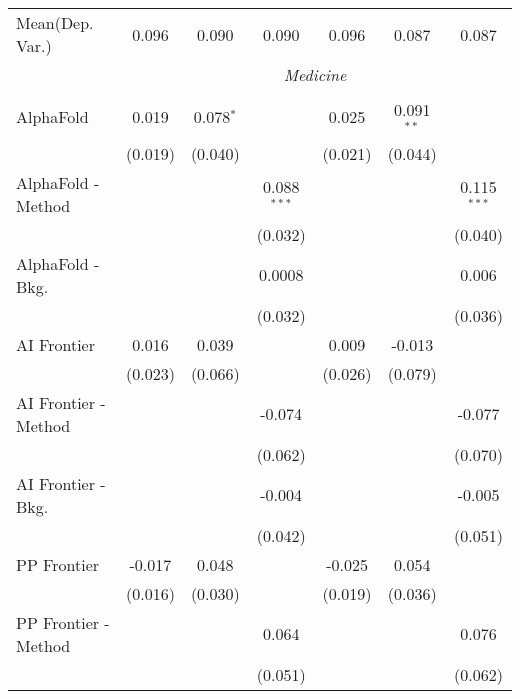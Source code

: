 \begin{tabular}{lcccccc}
Mean(Dep. Var.) & 0.096 & 0.090 & 0.090 & 0.096 & 0.087 & 0.087 \\
 & \multicolumn{6}{c}{\textit{Medicine}} \\ \\
   AlphaFold            & 0.019         & 0.078$^{*}$ &                & 0.025        & 0.091$^{**}$ &   \\   
                        & (0.019)       & (0.040)     &                & (0.021)      & (0.044)      &   \\   
   AlphaFold - Method   &               &             & 0.088$^{***}$  &              &              & 0.115$^{***}$\\   
                        &               &             & (0.032)        &              &              & (0.040)\\   
   AlphaFold - Bkg.     &               &             & 0.0008         &              &              & 0.006\\   
                        &               &             & (0.032)        &              &              & (0.036)\\   
   AI Frontier          & 0.016         & 0.039       &                & 0.009        & -0.013       &   \\   
                        & (0.023)       & (0.066)     &                & (0.026)      & (0.079)      &   \\   
   AI Frontier - Method &               &             & -0.074         &              &              & -0.077\\   
                        &               &             & (0.062)        &              &              & (0.070)\\   
   AI Frontier - Bkg.   &               &             & -0.004         &              &              & -0.005\\   
                        &               &             & (0.042)        &              &              & (0.051)\\   
   PP Frontier          & -0.017        & 0.048       &                & -0.025       & 0.054        &   \\   
                        & (0.016)       & (0.030)     &                & (0.019)      & (0.036)      &   \\   
   PP Frontier - Method &               &             & 0.064          &              &              & 0.076\\   
                        &               &             & (0.051)        &              &              & (0.062)\\   

\end{tabular}
